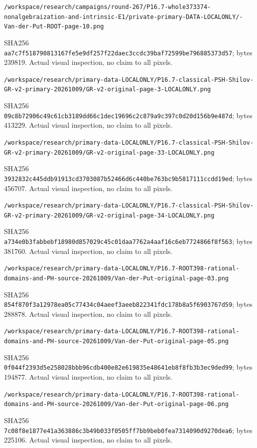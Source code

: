 \documentclass[11pt]{article}
\begin{document}
\texttt{/\allowbreak workspace/\allowbreak research/\allowbreak campaigns/\allowbreak round-267/\allowbreak P16.7-whole373374-nonalgebraization-and-intrinsic-E1/\allowbreak private-primary-DATA-LOCALONLY/-Van-der-Put-ROOT-page-10.png}

SHA256 \texttt{aa7c7f518790813167fe5e9df257f22daec3ccdc39baf72599be796885373d57}; bytes 239819. Actual visual inspection, no claim to all pixels.

\texttt{/\allowbreak workspace/\allowbreak research/\allowbreak primary-data-LOCALONLY/\allowbreak P16.7-classical-PSH-Shilov-GR-v2-primary-20261009/\allowbreak GR-v2-original-page-3-LOCALONLY.png}

SHA256 \texttt{09c8b72906c49c61cb3189dd66c1dec19696c2c879a9c397c0d20d156b9e487d}; bytes 413229. Actual visual inspection, no claim to all pixels.

\texttt{/\allowbreak workspace/\allowbreak research/\allowbreak primary-data-LOCALONLY/\allowbreak P16.7-classical-PSH-Shilov-GR-v2-primary-20261009/\allowbreak GR-v2-original-page-33-LOCALONLY.png}

SHA256 \texttt{3932832c445ddb91913cd3703087b52466d6c440be763bc9b5817111ccdd19ed}; bytes 456707. Actual visual inspection, no claim to all pixels.

\texttt{/\allowbreak workspace/\allowbreak research/\allowbreak primary-data-LOCALONLY/\allowbreak P16.7-classical-PSH-Shilov-GR-v2-primary-20261009/\allowbreak GR-v2-original-page-34-LOCALONLY.png}

SHA256 \texttt{a734e0b3fabbebf18980d857029c45c01daa7762a4aaf16c6eb7724866f8f563}; bytes 381760. Actual visual inspection, no claim to all pixels.

\texttt{/\allowbreak workspace/\allowbreak research/\allowbreak primary-data-LOCALONLY/\allowbreak P16.7-ROOT398-rational-domains-and-PH-source-20261009/\allowbreak Van-der-Put-original-page-03.png}

SHA256 \texttt{854f870f3a12978ea05c77434c04aeef3aeeb822341fdc178b8a5f6903767d59}; bytes 288878. Actual visual inspection, no claim to all pixels.

\texttt{/\allowbreak workspace/\allowbreak research/\allowbreak primary-data-LOCALONLY/\allowbreak P16.7-ROOT398-rational-domains-and-PH-source-20261009/\allowbreak Van-der-Put-original-page-05.png}

SHA256 \texttt{0f044f2393d5e258028bbb96cdb400e82e619835e48641eb8f8fb3b3ec9ded99}; bytes 194877. Actual visual inspection, no claim to all pixels.

\texttt{/\allowbreak workspace/\allowbreak research/\allowbreak primary-data-LOCALONLY/\allowbreak P16.7-ROOT398-rational-domains-and-PH-source-20261009/\allowbreak Van-der-Put-original-page-06.png}

SHA256 \texttt{7c08f8e1877e41a363886c3b49b033f0505ff7bb9beb0fea7314090d9270dea6}; bytes 225106. Actual visual inspection, no claim to all pixels.
\end{document}
